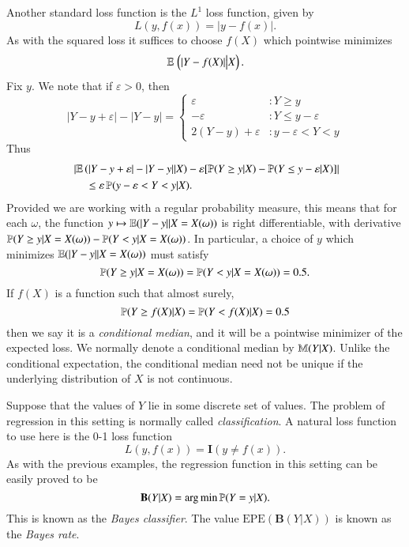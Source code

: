 \begin{example}
	Another standard loss function is the $L^1$ loss function, given by
	\[ L(y,f(x)) = |y - f(x)|. \]
	As with the squared loss it suffices to choose $f(X)$ which pointwise minimizes
	\[ \operatorname{\mathbb{E}}\left. \Big( |Y - f(X)| \big| X \right). \]
	Fix $y$. We note that if $\varepsilon > 0$, then
	\[ |Y - y + \varepsilon| - |Y - y| = \begin{cases} \varepsilon &: Y \geq y\\ -\varepsilon &: Y \leq y - \varepsilon \\
	2(Y - y) + \varepsilon &: y - \varepsilon < Y < y \end{cases} \]
	Thus
	\begin{align*}
		&\left| \operatorname{\mathbb{E}} \left( |Y - y + \varepsilon| - |Y - y| | X \right) - \varepsilon [\operatorname{\mathbb{P}}(Y \geq y | X) - \operatorname{\mathbb{P}}(Y \leq y - \varepsilon | X) ] \right|\\
		&\ \ \ \ \ \leq \varepsilon \operatorname{\mathbb{P}}(y - \varepsilon < Y < y | X).
	\end{align*}
	Provided we are working with a regular probability measure, this means that for each $\omega$, the function $y \mapsto \operatorname{\mathbb{E}}(|Y - y| | X = X(\omega))$ is right differentiable, with derivative $\operatorname{\mathbb{P}}(Y \geq y | X = X(\omega)) - \operatorname{\mathbb{P}}(Y < y | X = X(\omega))$. In particular, a choice of $y$ which minimizes $\operatorname{\mathbb{E}}(|Y - y| | X = X(\omega))$ must satisfy
	\[ \operatorname{\mathbb{P}}(Y \geq y | X = X(\omega)) = \operatorname{\mathbb{P}}(Y < y | X = X(\omega)) = 0.5. \]
	If $f(X)$ is a function such that almost surely,
	\[ \operatorname{\mathbb{P}}(Y \geq f(X) | X) = \operatorname{\mathbb{P}}(Y < f(X) | X) = 0.5 \]
	then we say it is a \emph{conditional median}, and it will be a pointwise minimizer of the expected loss. We normally denote a conditional median by $\operatorname{\mathbb{M}}(Y | X)$. Unlike the conditional expectation, the conditional median need not be unique if the underlying distribution of $X$ is not continuous.
\end{example}

\begin{example}
	Suppose that the values of $Y$ lie in some discrete set of values. The problem of regression in this setting is normally called \emph{classification}. A natural loss function to use here is the 0-1 loss function
	\[ L(y,f(x)) = \mathbf{I}(y \neq f(x)). \]
	As with the previous examples, the regression function in this setting can be easily proved to be
	\[ \mathbf{B}(Y|X) = \operatorname*{arg\,min} \operatorname{\mathbb{P}}(Y = y | X). \]
	This is known as the \emph{Bayes classifier}. The value $\text{EPE}(\mathbf{B}(Y|X))$ is known as the \emph{Bayes rate}.
\end{example}

